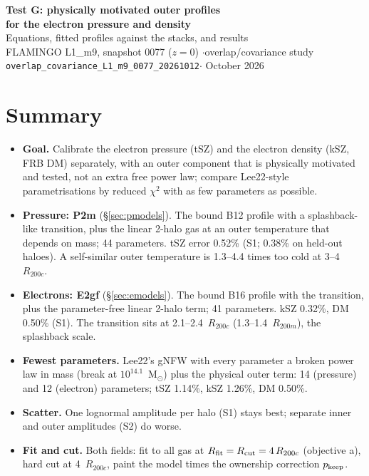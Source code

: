 \documentclass[10pt,a4paper]{article}
\newcommand{\Rc}{R_{200c}}
\newcommand{\Rfit}{R_{\rm fit}}
\newcommand{\Rcut}{R_{\rm cut}}
\newcommand{\pk}{p_{\rm keep}}
\begin{document}
\begin{center}
{\LARGE\bfseries Test G: physically motivated outer profiles\\[3pt] for the electron pressure and density}\\[8pt]
{\large Equations, fitted profiles against the stacks, and results}\\[6pt]
FLAMINGO L1\_m9, snapshot 0077 ($z=0$) \quad$\cdot$\quad overlap/covariance study \texttt{overlap\_covariance\_L1\_m9\_0077\_20261012}\quad$\cdot$ October 2026
\end{center}

\section*{Summary}
\begin{itemize}
\item \textbf{Goal.} Calibrate the electron pressure (tSZ) and the electron density (kSZ, FRB DM) separately, with an outer
  component that is physically motivated and tested, not an extra free power law; compare Lee22-style
  parametrisations by reduced $\chi^2$ with as few parameters as possible.
\item \textbf{Pressure: P2m} (\S\ref{sec:pmodels}). The bound B12 profile with a splashback-like transition, plus the linear
  2-halo gas at an outer temperature that depends on mass; 44 parameters. tSZ error 0.52\% (S1; 0.38\% on held-out
  haloes). A self-similar outer temperature is 1.3--4.4 times too cold at 3--4~$\Rc$.
\item \textbf{Electrons: E2gf} (\S\ref{sec:emodels}). The bound B16 profile with the transition, plus the
  parameter-free linear 2-halo term; 41 parameters. kSZ 0.32\%, DM 0.50\% (S1). The transition sits at 2.1--2.4~$\Rc$
  (1.3--1.4~$R_{200m}$), the splashback scale.
\item \textbf{Fewest parameters.} Lee22's gNFW with every parameter a broken power law in mass (break at
  $10^{14.1}$~M$_\odot$) plus the physical outer term: 14 (pressure) and 12 (electron) parameters; tSZ 1.14\%,
  kSZ 1.26\%, DM 0.50\%.
\item \textbf{Scatter.} One lognormal amplitude per halo (S1) stays best; separate inner and outer amplitudes (S2) do worse.
\item \textbf{Fit and cut.} Both fields: fit to all gas at $\Rfit=\Rcut=4\,\Rc$ (objective a), hard cut at 4~$\Rc$, paint
  the model times the ownership correction $\pk$.
\end{itemize}
\end{document}
